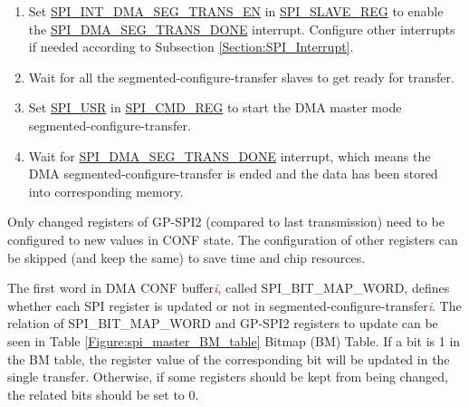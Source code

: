 \documentclass[main\_\_EN.tex]{subfiles}
\begin{document}
\begin{enumerate}
   \item Set \hyperref[fielddesc:SPIINTDMASEGTRANSEN]{SPI\_INT\_DMA\_SEG\_TRANS\_EN} in \hyperref[regdesc:SPISLAVEREG]{SPI\_SLAVE\_REG} to enable the \hyperref[fielddesc:SPIDMASEGTRANSDONE]{SPI\_DMA\_SEG\_TRANS\_DONE} interrupt. Configure other interrupts if needed according to Subsection \ref{Section:SPI_Interrupt}.

   \item Wait for all the segmented-configure-transfer slaves to get ready for transfer.

   \item Set \hyperref[fielddesc:SPIUSR]{SPI\_USR} in \hyperref[regdesc:SPICMDREG]{SPI\_CMD\_REG} to start the DMA master mode segmented-configure-transfer.

   \item Wait for \hyperref[fielddesc:SPIDMASEGTRANSDONE]{SPI\_DMA\_SEG\_TRANS\_DONE} interrupt, which means the DMA segmented-configure-transfer is ended and the data has been stored into corresponding memory.
 \end{enumerate}

Only changed registers of GP-SPI2 (compared to last transmission) need to be configured to new values in CONF state. The configuration of other registers can be skipped (and keep the same) to save time and chip resources.

The first word in DMA CONF buffer\textcolor{red}{\it i}, called SPI\_BIT\_MAP\_WORD, defines whether each SPI register is updated or not in segmented-configure-transfer\textcolor{red}{\it i}. The relation of SPI\_BIT\_MAP\_WORD and GP-SPI2 registers to update can be seen in Table \ref{Figure:spi_master_BM_table} Bitmap (BM) Table. If a bit is 1 in the BM table, the register value of the corresponding bit will be updated in the single transfer. Otherwise, if some registers should be kept from being changed, the related bits should be set to 0.
\end{document}
